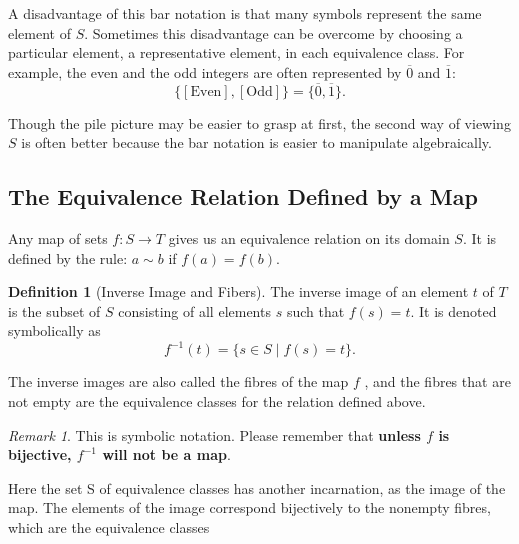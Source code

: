 \documentclass[
]{book}
\theoremstyle{definition}
\newtheorem{definition}{Definition}[chapter]
\theoremstyle{definition}
\theoremstyle{definition}
\theoremstyle{definition}
\theoremstyle{remark}
\newtheorem*{remark}{Remark}
\begin{document}
A disadvantage of this bar notation is that many symbols represent the same element of \(S\). Sometimes this disadvantage can be overcome by choosing a particular element, a representative element, in each equivalence class. For example, the even and the odd integers are often represented by \(\overline{0}\) and \(\overline{1}\):
\begin{equation}
\{[\text{Even}], [\text{Odd}]\} = \{ \overline{0}, \overline{1}\}.
\end{equation}

Though the pile picture may be easier to grasp at first, the second way of viewing \(S\) is often better because the bar notation is easier to manipulate algebraically.

\hypertarget{the-equivalence-relation-defined-by-a-map}{%
\subsection{The Equivalence Relation Defined by a Map}\label{the-equivalence-relation-defined-by-a-map}}

Any map of sets \(f : S \to T\) gives us an equivalence relation on its domain \(S\). It is defined by the rule: \(a \sim b\) if \(f(a) = f(b)\).

\begin{definition}[Inverse Image  and Fibers]
\protect\hypertarget{def:unnamed-chunk-31}{}\label{def:unnamed-chunk-31}The inverse image of an element \(t\) of \(T\) is the subset of \(S\) consisting of all elements \(s\) such that \(f(s) = t\). It is denoted symbolically as
\begin{equation}
f^{-1}(t) = \{s \in S \mid f(s) = t\}.
\end{equation}

The inverse images are also called the fibres of the map \(f\) , and the fibres that are not empty are the equivalence classes for the relation defined above.
\end{definition}

\begin{remark}
This is symbolic notation. Please remember that \textbf{unless \(f\) is bijective, \(f^{-1}\) will not be a map}.
\end{remark}

Here the set S of equivalence classes has another incarnation, as the image of the map.
The elements of the image correspond bijectively to the nonempty fibres, which are the
equivalence classes
\end{document}
